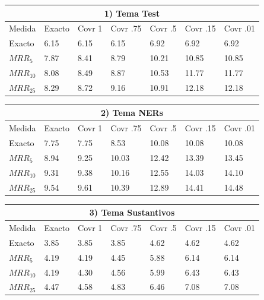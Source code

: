 \begin{table}
\centering
\begin{center}
\begin{tabular}{|l | l | l | l | l | l | l |}
\hline
\multicolumn{7}{|c|}{1) Tema Test}  \\ \hline
Medida & Exacto & Covr 1 & Covr .75 & Covr .5 & Covr .15 & Covr .01 \\ \hline
Exacto & 6.15 & 6.15 & 6.15 & 6.92 & 6.92 & 6.92  \\ \hline
$MRR_{5}$ & 7.87 & 8.41 & 8.79 & 10.21 & 10.85 & 10.85  \\ \hline
$MRR_{10}$ & 8.08 & 8.49 & 8.87 & 10.53 & 11.77 & 11.77  \\ \hline
$MRR_{25}$ & 8.29 & 8.72 & 9.16 & 10.91 & 12.18 & 12.18  \\ \hline
\end{tabular}

\medskip

\begin{tabular}{|l | l | l | l | l | l | l |}
\hline
\multicolumn{7}{|c|}{2) Tema NERs}  \\ \hline
Medida & Exacto & Covr 1 & Covr .75 & Covr .5 & Covr .15 & Covr .01 \\ \hline
Exacto & 7.75 & 7.75 & 8.53 & 10.08 & 10.08 & 10.08  \\ \hline
$MRR_{5}$ & 8.94 & 9.25 & 10.03 & 12.42 & 13.39 & 13.45  \\ \hline
$MRR_{10}$ & 9.31 & 9.38 & 10.16 & 12.55 & 14.03 & 14.10  \\ \hline
$MRR_{25}$ & 9.54 & 9.61 & 10.39 & 12.89 & 14.41 & 14.48  \\ \hline
\end{tabular}

\medskip


\begin{tabular}{|l | l | l | l | l | l | l |}
\hline
\multicolumn{7}{|c|}{3) Tema Sustantivos}  \\ \hline
Medida & Exacto & Covr 1 & Covr .75 & Covr .5 & Covr .15 & Covr .01 \\ \hline
Exacto & 3.85 & 3.85 & 3.85 & 4.62 & 4.62 & 4.62  \\ \hline
$MRR_{5}$ & 4.19 & 4.19 & 4.45 & 5.88 & 6.14 & 6.14  \\ \hline
$MRR_{10}$ & 4.19 & 4.30 & 4.56 & 5.99 & 6.43 & 6.43  \\ \hline
$MRR_{25}$ & 4.47 & 4.58 & 4.83 & 6.46 & 7.08 & 7.08  \\ \hline
\end{tabular}


\end{center}
\end{table}
